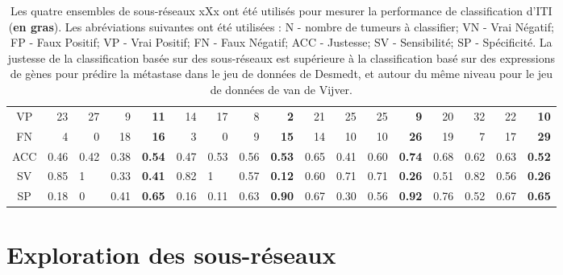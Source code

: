 \begin{sidewaystable}
\begin{center}
\begin{tabular}{crrrrrrrrrrrrrrrr}
						VP        & 23    & 27    & 9     & \textbf{11}                               & 14    & 17    & 8     & \textbf{2}                    & 21    & 25    & 25    & \textbf{9}                                & 20    & 32    & 22    & \textbf{10}                    \\
						FN        & 4     & 0     & 18    & \textbf{16}                               & 3     & 0     & 9     & \textbf{15}                   & 14    & 10    & 10    & \textbf{26}                               & 19    & 7     & 17    & \textbf{29}                    \\
						\midrule
						ACC       & 0.46  & 0.42  & 0.38  & \textbf{0.54}                             & 0.47  & 0.53  & 0.56  & \textbf{0.53}                 & 0.65  & 0.41  & 0.60  & \textbf{0.74}                             & 0.68  & 0.62  & 0.63  & \textbf{0.52}                  \\
						SV        & 0.85  & \multicolumn{1}{l}{1} & 0.33  & \textbf{0.41}             & 0.82  & \multicolumn{1}{l}{1} & 0.57  & \textbf{0.12} & 0.60  & 0.71  & 0.71  & \textbf{0.26}                             & 0.51  & 0.82  & 0.56  & \textbf{0.26}                  \\
						SP        & 0.18  & \multicolumn{1}{l}{0} & 0.41  & \textbf{0.65}             & 0.16  & 0.11                  & 0.63  & \textbf{0.90} & 0.67  & 0.30  & 0.56  & \textbf{0.92}                             & 0.76  & 0.52  & 0.67  & \textbf{0.65}                  \\
						\bottomrule
					\end{tabular}
					\label{tab:Res2Classif}
					\vspace{5ex}
					\caption*{Les quatre ensembles de sous-réseaux xXx ont été utilisés pour mesurer la performance de classification d'ITI (\textbf{en gras}). Les abréviations suivantes ont été utilisées : N - nombre de tumeurs à classifier; VN - Vrai Négatif; FP - Faux Positif; VP - Vrai Positif; FN - Faux Négatif; ACC - Justesse; SV - Sensibilité; SP - Spécificité. La justesse de la classification basée sur des sous-réseaux est supérieure à la classification basé sur des expressions de gènes pour prédire la métastase dans le jeu de données de Desmedt, et autour du même niveau pour le jeu de données de van de Vijver.}
				\end{center}
			\end{sidewaystable}

		\section{\textcolor{green!45!black}{Exploration des sous-réseaux}}


